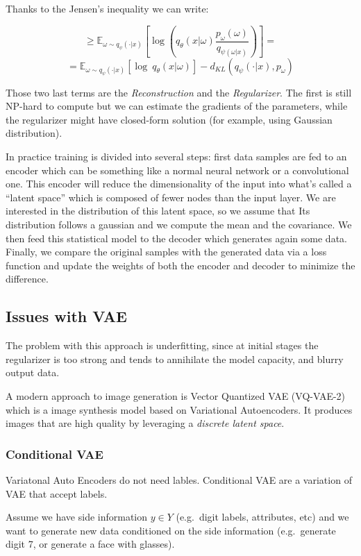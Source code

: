 \documentclass[11pt]{article}
\begin{document}
Thanks to the Jensen's inequality we can write:

\[\ge \mathbb{E}_{\omega \sim q_\psi (\cdot|x)}[\log(q_{\theta}(x|\omega)\frac{p_{\omega}(\omega)}{q_{\psi (\omega | x)}})] =\]
\[=  \mathbb{E}_{\omega \sim q_\psi (\cdot|x)}[\log\ q_\theta (x|\omega)]-d_{KL}(q_\psi (\cdot|x), p_\omega)\]

Those two last terms are the \emph{Reconstruction} and the
\emph{Regularizer}. The first is still NP-hard to compute but we can
estimate the gradients of the parameters, while the regularizer might
have closed-form solution (for example, using Gaussian distribution).

In practice training is divided into several steps: first data samples
are fed to an encoder which can be something like a normal neural
network or a convolutional one. This encoder will reduce the
dimensionality of the input into what's called a ``latent space'' which
is composed of fewer nodes than the input layer. We are interested in
the distribution of this latent space, so we assume that Its
distribution follows a gaussian and we compute the mean and the
covariance. We then feed this statistical model to the decoder which
generates again some data. Finally, we compare the original samples with
the generated data via a loss function and update the weights of both
the encoder and decoder to minimize the difference.

\subsection{Issues with VAE}\label{issues-with-vae}

The problem with this approach is underfitting, since at initial stages
the regularizer is too strong and tends to annihilate the model
capacity, and blurry output data.

A modern approach to image generation is Vector Quantized VAE (VQ-VAE-2)
which is a image synthesis model based on Variational Autoencoders. It
produces images that are high quality by leveraging a \emph{discrete
latent space}.

\subsubsection{Conditional VAE}\label{conditional-vae}

Variatonal Auto Encoders do not need lables. Conditional VAE are a
variation of VAE that accept labels.

Assume we have side information \(y\in Y\) (e.g.~digit labels,
attributes, etc) and we want to generate new data conditioned on the
side information (e.g.~generate digit 7, or generate a face with
glasses).
\end{document}
